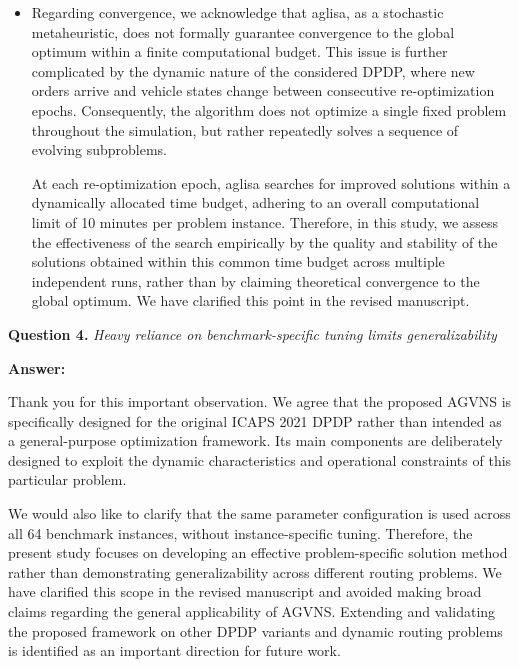 \documentclass[11pt]{article}
\newcommand{\question}[2]{\vspace{0.5em}\noindent\textbf{Question #1.} \emph{#2}\par}
\newcommand{\answer}{\noindent\textbf{Answer:}\par}
\begin{document}
\begin{itemize}
{Combining these components, the overall worst-case computational complexity of \gls{aglisa} can be expressed as
\[
O\left(PNKL^2 + (GP+I)L^q\right).
\]

It should be noted that $G$ and $I$ are not unbounded in the considered dynamic setting. At each re-optimization epoch, both evolutionary search and VNS refinement are restricted by the fixed computational budget imposed by the ICAPS 2021 benchmark. Therefore, the above expression represents the 
worst-case computational growth of the main search components, whereas the actual computation performed at each decision epoch is bounded by the available wall-clock time.
}
\item Regarding convergence, we acknowledge that \gls{aglisa}, as a stochastic metaheuristic, does not formally guarantee convergence to the global optimum within a finite computational budget. This issue is further complicated by the dynamic nature of the considered DPDP, where new orders arrive and vehicle states change between consecutive re-optimization epochs. Consequently, the algorithm does not optimize a single fixed problem throughout the simulation, but rather repeatedly solves a sequence of evolving subproblems.

At each re-optimization epoch, \gls{aglisa} searches for improved solutions within a dynamically allocated time budget, adhering to an overall computational limit of 10 minutes per problem instance. Therefore, in this study, we assess the effectiveness of the search empirically by the quality and stability of the solutions obtained within this common time budget across multiple independent runs, rather than by claiming theoretical convergence to the global optimum. We have clarified this point in the revised manuscript.
\end{itemize}
\question{4}{Heavy reliance on benchmark-specific tuning limits generalizability}
\answer
Thank you for this important observation. We agree that the proposed AGVNS is specifically designed for the original ICAPS 2021 DPDP rather than intended as a general-purpose optimization framework. Its main components are deliberately designed to exploit the dynamic characteristics and operational constraints of this particular problem.

We would also like to clarify that the same parameter configuration is used across all 64 benchmark instances, without instance-specific tuning. Therefore, the present study focuses on developing an effective problem-specific solution method rather than demonstrating generalizability across different routing problems. We have clarified this scope in the revised manuscript and avoided making broad claims regarding the general applicability of AGVNS. Extending and validating the proposed framework on other DPDP variants and dynamic routing problems is identified as an important direction for future work.
\end{document}
